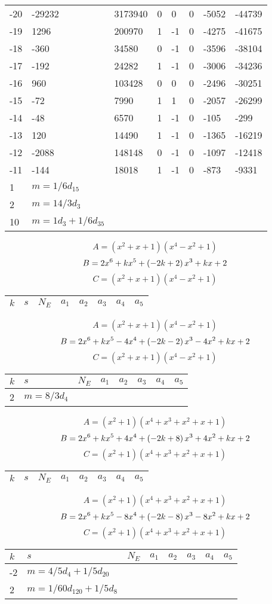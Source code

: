\documentclass{amsart}
\begin{document}
\begin{longtable}{|l|l|l|lllll|}
-20&-29232&3173940&0&0&0&-5052&-44739\\
-19&1296&200970&1&-1&0&-4275&-41675\\
-18&-360&34580&0&-1&0&-3596&-38104\\
-17&-192&24282&1&-1&0&-3006&-34236\\
-16&960&103428&0&0&0&-2496&-30251\\
-15&-72&7990&1&1&0&-2057&-26299\\
-14&-48&6570&1&-1&0&-105&-299\\
-13&120&14490&1&-1&0&-1365&-16219\\
-12&-2088&148148&0&-1&0&-1097&-12418\\
-11&-144&18018&1&-1&0&-873&-9331\\
1&$m=1/6d_{15}$&&\multicolumn{5}{c|}{}\\
2&$m=14/3d_{3}$&&\multicolumn{5}{c|}{}\\
10&$m=1d_{3}+1/6d_{35}$&&\multicolumn{5}{c|}{}\\
\hline
\end{longtable}
$$A=(x^2
 + x
 + 1)(x^4
 - x^2
 + 1)$$
$$B=2\*x^6
 + k\*x^5
 + \left(-2\*k
 + 2\right) \*x^3
 + k\*x
 + 2$$
$$C=(x^2
 + x
 + 1)(x^4
 - x^2
 + 1)$$
\begin{longtable}{|l|l|l|lllll|}
\hline
$k$ & $s$ & $N_E$ & $a_1$ & $a_2$ & $a_3$ & $a_4$ & $a_5$\\
\hline
\hline
\end{longtable}
$$A=(x^2
 + x
 + 1)(x^4
 - x^2
 + 1)$$
$$B=2\*x^6
 + k\*x^5
 - 4\*x^4
 + \left(-2\*k
 - 2\right) \*x^3
 - 4\*x^2
 + k\*x
 + 2$$
$$C=(x^2
 + x
 + 1)(x^4
 - x^2
 + 1)$$
\begin{longtable}{|l|l|l|lllll|}
\hline
$k$ & $s$ & $N_E$ & $a_1$ & $a_2$ & $a_3$ & $a_4$ & $a_5$\\
\hline
2&$m=8/3d_{4}$&&\multicolumn{5}{c|}{}\\
\hline
\end{longtable}
$$A=(x^2
 + 1)(x^4
 + x^3
 + x^2
 + x
 + 1)$$
$$B=2\*x^6
 + k\*x^5
 + 4\*x^4
 + \left(-2\*k
 + 8\right) \*x^3
 + 4\*x^2
 + k\*x
 + 2$$
$$C=(x^2
 + 1)(x^4
 + x^3
 + x^2
 + x
 + 1)$$
\begin{longtable}{|l|l|l|lllll|}
\hline
$k$ & $s$ & $N_E$ & $a_1$ & $a_2$ & $a_3$ & $a_4$ & $a_5$\\
\hline
\hline
\end{longtable}
$$A=(x^2
 + 1)(x^4
 + x^3
 + x^2
 + x
 + 1)$$
$$B=2\*x^6
 + k\*x^5
 - 8\*x^4
 + \left(-2\*k
 - 8\right) \*x^3
 - 8\*x^2
 + k\*x
 + 2$$
$$C=(x^2
 + 1)(x^4
 + x^3
 + x^2
 + x
 + 1)$$
\begin{longtable}{|l|l|l|lllll|}
\hline
$k$ & $s$ & $N_E$ & $a_1$ & $a_2$ & $a_3$ & $a_4$ & $a_5$\\
\hline
-2&$m=4/5d_{4}+1/5d_{20}$&&\multicolumn{5}{c|}{}\\
2&$m=1/60d_{120}+1/5d_{8}$&&\multicolumn{5}{c|}{}\\
\hline
\end{longtable}
\end{document}

